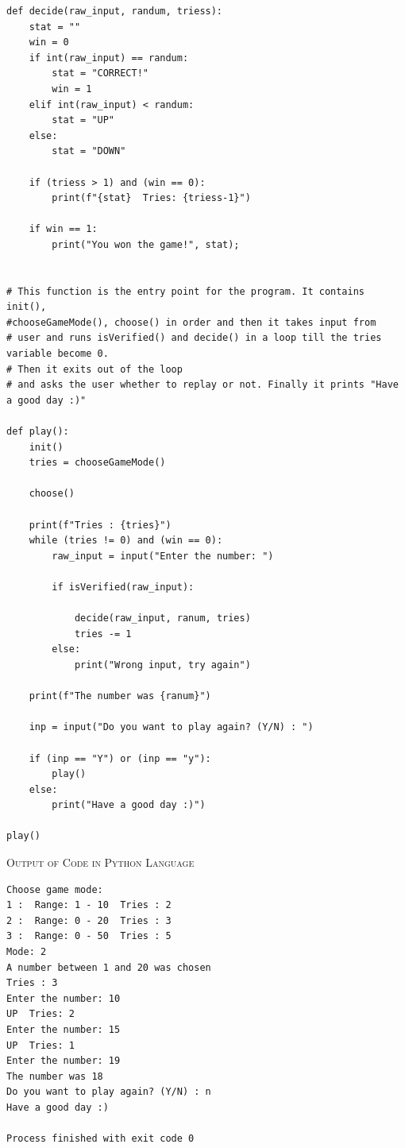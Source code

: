 \documentclass{report}
\begin{document}
\begin{verbatim}
def decide(raw_input, randum, triess):
    stat = ""
    win = 0
    if int(raw_input) == randum:
        stat = "CORRECT!"
        win = 1
    elif int(raw_input) < randum:
        stat = "UP"
    else:
        stat = "DOWN"

    if (triess > 1) and (win == 0):
        print(f"{stat}  Tries: {triess-1}")

    if win == 1:
        print("You won the game!", stat);


# This function is the entry point for the program. It contains init(), 
#chooseGameMode(), choose() in order and then it takes input from
# user and runs isVerified() and decide() in a loop till the tries variable become 0.
# Then it exits out of the loop
# and asks the user whether to replay or not. Finally it prints "Have a good day :)"

def play():
    init()
    tries = chooseGameMode()

    choose()

    print(f"Tries : {tries}")
    while (tries != 0) and (win == 0):
        raw_input = input("Enter the number: ")

        if isVerified(raw_input):

            decide(raw_input, ranum, tries)
            tries -= 1
        else:
            print("Wrong input, try again")

    print(f"The number was {ranum}")

    inp = input("Do you want to play again? (Y/N) : ")

    if (inp == "Y") or (inp == "y"):
        play()
    else:
        print("Have a good day :)")

play()
\end{verbatim}

\hfill

\begin{center}
	\textsc{\LARGE{Output of Code in Python Language}}
\end{center}

\hfill

\begin{verbatim}
Choose game mode:
1 :  Range: 1 - 10  Tries : 2
2 :  Range: 0 - 20  Tries : 3
3 :  Range: 0 - 50  Tries : 5
Mode: 2
A number between 1 and 20 was chosen
Tries : 3
Enter the number: 10
UP  Tries: 2
Enter the number: 15
UP  Tries: 1
Enter the number: 19
The number was 18
Do you want to play again? (Y/N) : n
Have a good day :)

Process finished with exit code 0
\end{verbatim}
\end{document}
